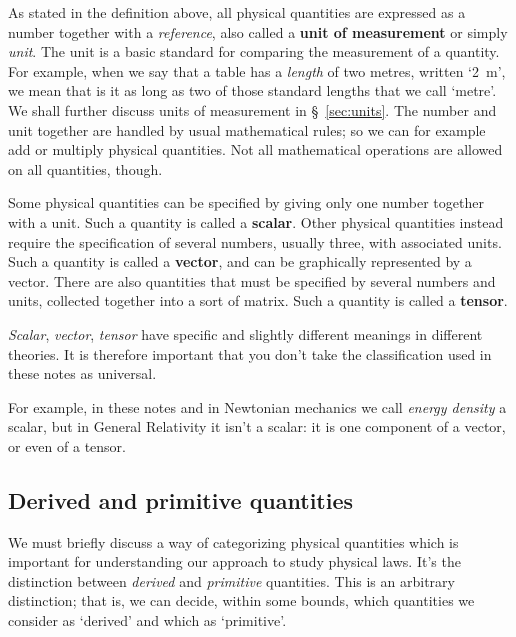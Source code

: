 \documentclass[a4paper,12pt,%
onecolumn,oneside,%
british%
]{memoir}
\renewcommand*{\|}[1][]{\nonscript\:#1\vert\nonscript\:\mathopen{}}
\newcommand*{\sect}{\S}%
\begin{document}
As stated in the definition above, all physical quantities are expressed as a number together with a \emph{reference}, also called a \textbf{unit of measurement} or simply \emph{unit}. The unit is a basic standard for comparing the measurement of a quantity. For example, when we say that a table has a \emph{length} of two metres, written \enquote*{\qty{2}{m}}, we mean that is it as long as two of those standard lengths that we call \enquote*{metre}. We shall further discuss units of measurement in \sect~\ref{sec:units}. The number and unit together are handled by usual mathematical rules; so we can for example add or multiply physical quantities. Not all mathematical operations are allowed on all quantities, though.

\medskip

Some physical quantities can be specified by giving only one number together with a unit. Such a quantity is called a \textbf{scalar}. Other physical quantities instead require the specification of several numbers, usually three, with associated units. Such a quantity is called a \textbf{vector}, and can be graphically represented by a vector. There are also quantities that must be specified by several numbers and units, collected together into a sort of matrix. Such a quantity is called a \textbf{tensor}.
\begin{warning}
  \emph{Scalar}, \emph{vector}, \emph{tensor} have specific and slightly different meanings in different theories. It is therefore important that you don't take the classification used in these notes as universal.

  \smallskip

  For example, in these notes and in Newtonian mechanics we call \emph{energy density} a scalar, but in General Relativity it isn't a scalar: it is one component of a vector, or even of a tensor.
\end{warning}


\subsection{Derived and primitive quantities}
\label{sec:derived_primitive_quant}

We must briefly discuss a way of categorizing physical quantities which is important for understanding our approach to study physical laws. It's the distinction between \emph{derived} and \emph{primitive} quantities. This is an arbitrary distinction; that is, we can decide, within some bounds, which quantities we consider as \enquote*{derived} and which as \enquote*{primitive}.
\end{document}
